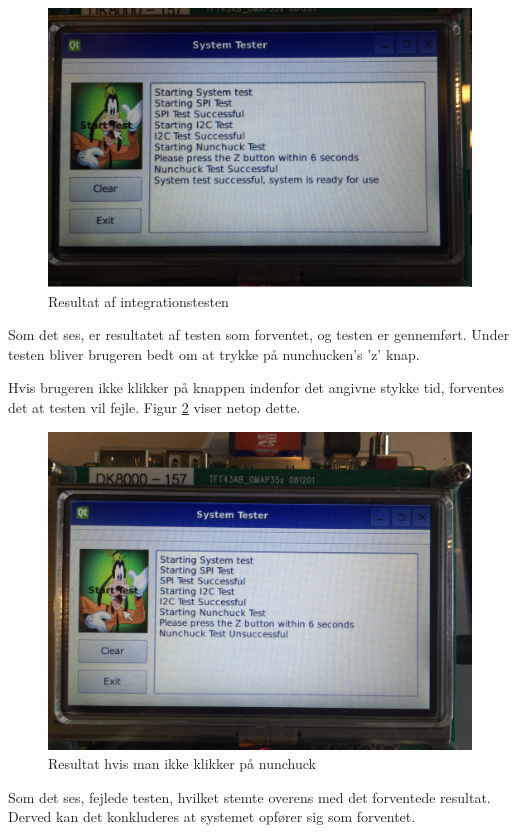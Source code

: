 \begin{figure}[H]
	\centering
	\includegraphics[width=\textwidth]{Test/images/IntegrationstestProtokoller/resultat2}
	\caption{Resultat af integrationstesten}
	\label{figure:integrationstestresult}
\end{figure}

\noindent Som det ses, er resultatet af testen som forventet, og testen er gennemført. Under testen bliver brugeren bedt om at trykke på nunchucken's 'z' knap. \newline 

\noindent Hvis brugeren ikke klikker på knappen indenfor det angivne stykke tid, forventes det at testen vil fejle. Figur \ref{figure:integrationstestresult1} viser netop dette.


\begin{figure}[H]
	\centering
	\includegraphics[width=\textwidth]{Test/images/IntegrationstestProtokoller/resultat1}
	\caption{Resultat hvis man ikke klikker på nunchuck}
	\label{figure:integrationstestresult1}
\end{figure}

\noindent Som det ses, fejlede testen, hvilket stemte overens med det forventede resultat. Derved kan det konkluderes at systemet opfører sig som forventet.
